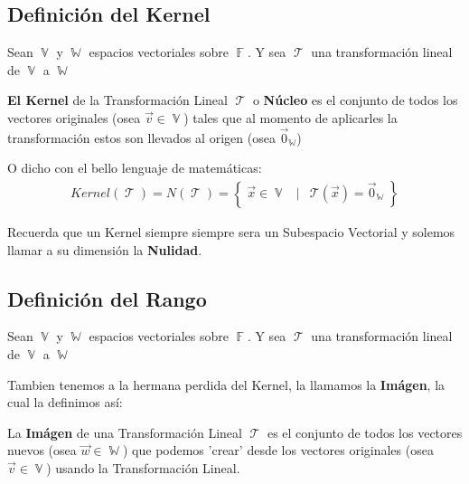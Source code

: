 \documentclass[12pt, fleqn]{report}                             %
\DeclareMathOperator \Space {\quad}                             %
\DeclareMathOperator \MiniSpace {\;}                            %
\newcommand \Such {\MiniSpace | \MiniSpace}                     %
\theoremstyle{break}                                            %
\DeclareMathOperator \GenericField {\mathbb{F}}                 %
\DeclareMathOperator \VectorSet    {\mathbb{V}}                 %
\DeclareMathOperator \SubVectorSet {\mathbb{W}}                 %
\DeclareMathOperator \LinTrans {\mathcal{T}}                    %
\newcommand{\Set}[1]    {\left\{ \; #1 \; \right\}}             %
\newcommand{\Wrap}[1]    {\left( #1 \right)}                    %
\newcommand{\FnLinTrans}[1]{\mathcal{T}\Wrap{#1}}               %
\begin{document}
            \subsection{Definición del Kernel}

                Sean $\VectorSet$ y $\SubVectorSet$ espacios vectoriales sobre $\GenericField$.
                Y sea $\LinTrans$ una transformación lineal de $\VectorSet$ a $\SubVectorSet$

                \textbf{El Kernel} de la Transformación Lineal $\LinTrans$ o \textbf{Núcleo} es el conjunto 
                de todos los vectores originales (osea $\vec v \in \VectorSet$) tales que al momento de
                aplicarles la transformación estos son llevados al origen (osea $\vec 0_{\SubVectorSet}$)

                O dicho con el bello lenguaje de matemáticas:
                \begin{align*}
                    Kernel(\LinTrans) 
                        = N(\LinTrans) 
                        = \Set{\vec x \in \VectorSet \Such \FnLinTrans{\vec x} = \vec 0_{\SubVectorSet}}
                \end{align*}

                Recuerda que un Kernel siempre siempre sera un Subespacio Vectorial y solemos
                llamar a su dimensión la \textbf{Nulidad}.


            \subsection{Definición del Rango}

                Sean $\VectorSet$ y $\SubVectorSet$ espacios vectoriales sobre $\GenericField$.
                Y sea $\LinTrans$ una transformación lineal de $\VectorSet$ a $\SubVectorSet$

                Tambien tenemos a la hermana perdida del Kernel, la llamamos la \textbf{Imágen},
                la cual la definimos así:

                La \textbf{Imágen} de una Transformación Lineal  $\LinTrans$ es el conjunto de todos los vectores
                nuevos (osea $\vec w \in \SubVectorSet$) que podemos 'crear' desde los vectores originales
                (osea $\vec v \in \VectorSet$) usando la Transformación Lineal.
\end{document}
